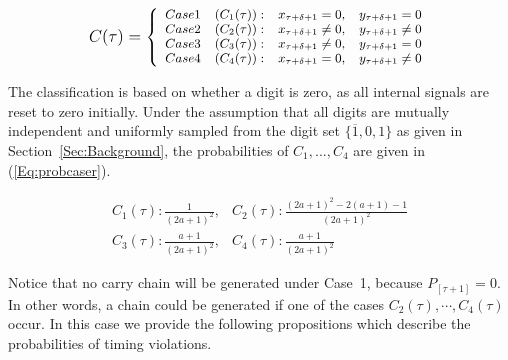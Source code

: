 \documentclass[journal]{IEEEtran}
\begin{document}
\begin{equation}\label{Eq:class}
\footnotesize
    C(\tau)= \left\{ \begin{array}{llll}
        Case 1 & (C_1(\tau)): & x_{\tau +\delta+1}=0, & y_{\tau +\delta+1}=0\\
        Case 2 & (C_2(\tau)): & x_{\tau +\delta+1}\neq 0, & y_{\tau +\delta+1}\neq 0\\
        Case 3 & (C_3(\tau)): & x_{\tau +\delta+1}\neq 0, & y_{\tau +\delta+1}=0\\
        Case 4 & (C_4(\tau)): & x_{\tau +\delta+1}=0, & y_{\tau +\delta+1}\neq 0
\end{array} \right.
\normalsize
\end{equation}

The classification is based on whether a digit is zero, as all internal signals are reset to zero initially. Under the assumption that all digits are mutually independent and uniformly sampled from the digit set  $\{\overline{1},0,1\}$ as given in Section~\ref{Sec:Background}, the probabilities of $C_1,...,C_4$ are given in (\ref{Eq:probcaser}).

\begin{equation}\label{Eq:probcaser}
\begin{array}{ll}
C_1(\tau): \frac{1}{(2a+1)^2}, &  C_2(\tau): \frac{(2a+1)^2-2(a+1)-1}{(2a+1)^2}\\
C_3(\tau):\frac{a+1}{(2a+1)^2}, & C_4(\tau):  \frac{a+1}{(2a+1)^2}
\end{array}
\end{equation}

Notice that no carry chain will be generated under Case~1, because $P_{[\tau+1]}=0$. In other words, a chain could be generated if one of  the cases $C_2(\tau),\cdots,C_4(\tau)$ occur. In this case we provide the following propositions which describe the probabilities of timing violations.
\end{document}
